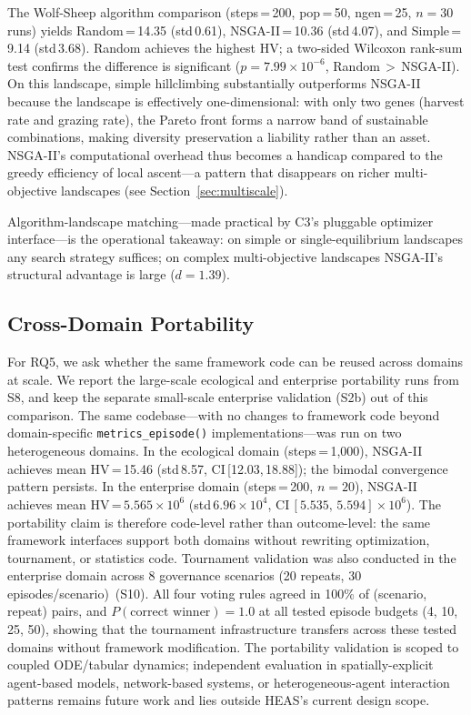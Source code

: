 \documentclass{wscpaperproc}
\begin{document}
The Wolf-Sheep algorithm comparison (steps\,=\,200, pop\,=\,50, ngen\,=\,25,
$n\!=\!30$ runs) yields Random\,=\,14.35 (std\,0.61), NSGA-II\,=\,10.36
(std\,4.07), and Simple\,=\,9.14 (std\,3.68). Random achieves the highest
HV; a two-sided Wilcoxon rank-sum test confirms the difference is significant
($p\!=\!7.99\!\times\!10^{-6}$, Random\,$>$\,NSGA-II). On this landscape,
simple hillclimbing substantially outperforms NSGA-II because the landscape
is effectively one-dimensional: with only two genes (harvest rate and grazing
rate), the Pareto front forms a narrow band of sustainable combinations,
making diversity preservation a liability rather than an asset. NSGA-II's
computational overhead thus becomes a handicap compared to the greedy
efficiency of local ascent---a pattern that disappears on richer multi-objective
landscapes (see Section~\ref{sec:multiscale}).

Algorithm-landscape matching---made practical by C3's pluggable optimizer
interface---is the operational takeaway: on simple or single-equilibrium
landscapes any search strategy suffices; on complex multi-objective
landscapes NSGA-II's structural advantage is large ($d\!=\!1.39$).

\subsection{Cross-Domain Portability}
\label{sec:crossdomain}

For RQ5, we ask whether the same framework code can be
reused across domains at scale. We report the large-scale ecological and
enterprise portability runs from S8, and keep the separate small-scale
enterprise validation (S2b) out of this comparison. The same codebase---with no
changes to framework code beyond domain-specific \texttt{metrics\_episode()}
implementations---was run on two heterogeneous domains. In the ecological domain
(steps\,=\,1,000), NSGA-II achieves mean HV\,=\,15.46
(std\,8.57, CI\,[12.03,\,18.88]); the bimodal convergence pattern persists. In
the enterprise domain (steps\,=\,200, $n\!=\!20$), NSGA-II achieves mean
HV\,=\,$5.565\!\times\!10^{6}$ (std\,$6.96\!\times\!10^{4}$,
CI\,$[5.535,\,5.594]\!\times\!10^{6}$). The portability claim is therefore
code-level rather than outcome-level: the same framework interfaces support both
domains without rewriting optimization, tournament, or statistics code.
Tournament validation was also conducted in the enterprise
domain across 8 governance scenarios (20 repeats, 30 episodes/scenario)~(S10).
All four voting rules agreed in 100\% of (scenario, repeat) pairs, and
$P(\text{correct winner})\!=\!1.0$ at all tested episode budgets (4, 10, 25,
50), showing that the tournament infrastructure transfers across these tested
domains without framework modification. The portability validation is scoped to
coupled ODE/tabular dynamics; independent evaluation in spatially-explicit
agent-based models, network-based systems, or heterogeneous-agent interaction
patterns remains future work and lies outside HEAS's current design scope.
\end{document}
